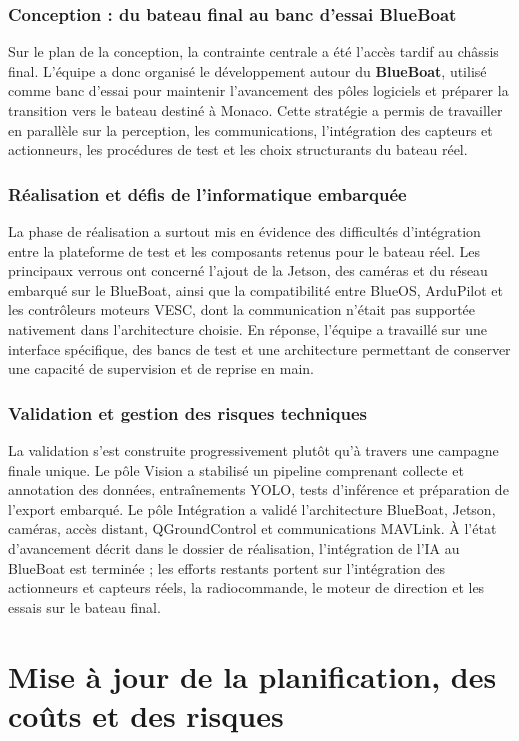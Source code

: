 \documentclass[11pt,letterpaper]{article}
\begin{document}
\subsubsection{Conception : du bateau final au banc d'essai BlueBoat}
Sur le plan de la conception, la contrainte centrale a été l'accès tardif au châssis final. L'équipe a donc organisé le développement autour du \textbf{BlueBoat}, utilisé comme banc d'essai pour maintenir l'avancement des pôles logiciels et préparer la transition vers le bateau destiné à Monaco. Cette stratégie a permis de travailler en parallèle sur la perception, les communications, l'intégration des capteurs et actionneurs, les procédures de test et les choix structurants du bateau réel.

\subsubsection{Réalisation et défis de l'informatique embarquée}
La phase de réalisation a surtout mis en évidence des difficultés d'intégration entre la plateforme de test et les composants retenus pour le bateau réel. Les principaux verrous ont concerné l'ajout de la Jetson, des caméras et du réseau embarqué sur le BlueBoat, ainsi que la compatibilité entre BlueOS, ArduPilot et les contrôleurs moteurs VESC, dont la communication n'était pas supportée nativement dans l'architecture choisie. En réponse, l'équipe a travaillé sur une interface spécifique, des bancs de test et une architecture permettant de conserver une capacité de supervision et de reprise en main.

\subsubsection{Validation et gestion des risques techniques}
La validation s'est construite progressivement plutôt qu'à travers une campagne finale unique. Le pôle Vision a stabilisé un pipeline comprenant collecte et annotation des données, entraînements YOLO, tests d'inférence et préparation de l'export embarqué. Le pôle Intégration a validé l'architecture BlueBoat, Jetson, caméras, accès distant, QGroundControl et communications MAVLink. À l'état d'avancement décrit dans le dossier de réalisation, l'intégration de l'IA au BlueBoat est terminée ; les efforts restants portent sur l'intégration des actionneurs et capteurs réels, la radiocommande, le moteur de direction et les essais sur le bateau final.

\section{Mise à jour de la planification, des coûts et des risques}
\end{document}
